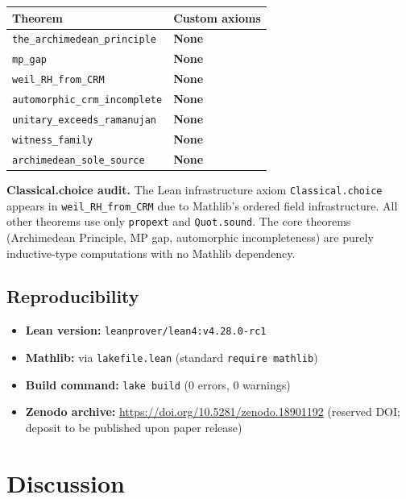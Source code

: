 \documentclass[11pt]{article}
\theoremstyle{definition}
\theoremstyle{remark}
\begin{document}
\begin{center}
\small
\begin{tabular}{ll}
\toprule
\textbf{Theorem} & \textbf{Custom axioms} \\
\midrule
\texttt{the\_archimedean\_principle} & \textbf{None} \\
\texttt{mp\_gap} & \textbf{None} \\
\texttt{weil\_RH\_from\_CRM} & \textbf{None} \\
\texttt{automorphic\_crm\_incomplete} & \textbf{None} \\
\texttt{unitary\_exceeds\_ramanujan} & \textbf{None} \\
\texttt{witness\_family} & \textbf{None} \\
\texttt{archimedean\_sole\_source} & \textbf{None} \\
\bottomrule
\end{tabular}
\end{center}

\medskip\noindent
\textbf{Classical.choice audit.} The Lean infrastructure axiom \texttt{Classical.choice} appears in \texttt{weil\_RH\_from\_CRM} due to Mathlib's ordered field infrastructure. All other theorems use only \texttt{propext} and \texttt{Quot.sound}. The core theorems (Archimedean Principle, MP gap, automorphic incompleteness) are purely inductive-type computations with no Mathlib dependency.

\subsection{Reproducibility}

\begin{itemize}
\item \textbf{Lean version:} \texttt{leanprover/lean4:v4.28.0-rc1}
\item \textbf{Mathlib:} via \texttt{lakefile.lean} (standard \texttt{require mathlib})
\item \textbf{Build command:} \texttt{lake build} (0 errors, 0 warnings)
\item \textbf{Zenodo archive:} \url{https://doi.org/10.5281/zenodo.18901192} (reserved DOI; deposit to be published upon paper release)
\end{itemize}

\section{Discussion}
\label{sec:discuss}
\end{document}
